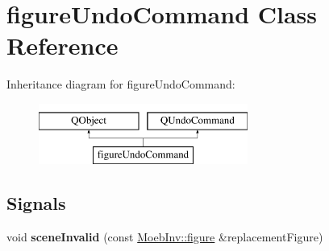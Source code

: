 \hypertarget{classfigure_undo_command}{}\section{figure\+Undo\+Command Class Reference}
\label{classfigure_undo_command}
Inheritance diagram for figure\+Undo\+Command\+:\begin{figure}[H]
\begin{center}
\leavevmode
\includegraphics[height=2.000000cm]{classfigure_undo_command}
\end{center}
\end{figure}
\subsection*{Signals}
\begin{DoxyCompactItemize}
\item 
\mbox{\label{classfigure_undo_command_a0826ae627f25daaa23ba9ccdd7e8fda2}} 
void {\bfseries scene\+Invalid} (const \mbox{\hyperlink{class_moeb_inv_1_1figure}{Moeb\+Inv\+::figure}} \&replacement\+Figure)
\end{DoxyCompactItemize}
